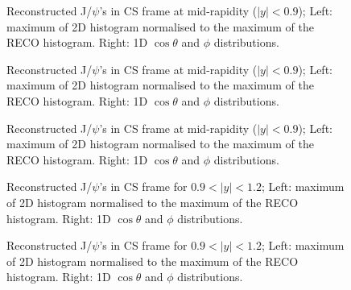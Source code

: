 \documentclass[12pt]{article}
\newcommand{\jpsi}{J/$\psi$}
\begin{document}
\begin{figure}[htbp]
\centering
{}
\caption{Reconstructed \jpsi's in CS frame at mid-rapidity ($|y| < 0.9$); Left: maximum of 2D histogram normalised to the maximum of the RECO histogram. Right: 1D $\cos\theta$ and $\phi$ distributions.}
\label{fig:trackerMuonsVsEta}
\end{figure} \clearpage 

\begin{figure}[htbp]
\centering
{}
\caption{Reconstructed \jpsi's in CS frame at mid-rapidity ($|y| < 0.9$); Left: maximum of 2D histogram normalised to the maximum of the RECO histogram. Right: 1D $\cos\theta$ and $\phi$ distributions.}
\label{fig:trackerMuonsVsEta}
\end{figure} \clearpage 

\begin{figure}[htbp]
\centering
{}
\caption{Reconstructed \jpsi's in CS frame at mid-rapidity ($|y| < 0.9$); Left: maximum of 2D histogram normalised to the maximum of the RECO histogram. Right: 1D $\cos\theta$ and $\phi$ distributions.}
\label{fig:trackerMuonsVsEta}
\end{figure} \clearpage 


\begin{figure}[htbp]
\centering
{}
\caption{Reconstructed \jpsi's in CS frame for $0.9 < |y| < 1.2$; Left: maximum of 2D histogram normalised to the maximum of the RECO histogram. Right: 1D $\cos\theta$ and $\phi$ distributions.}
\label{fig:trackerMuonsVsEta}
\end{figure} \clearpage 

\begin{figure}[htbp]
\centering
{}
\caption{Reconstructed \jpsi's in CS frame for $0.9 < |y| < 1.2$; Left: maximum of 2D histogram normalised to the maximum of the RECO histogram. Right: 1D $\cos\theta$ and $\phi$ distributions.}
\label{fig:trackerMuonsVsEta}
\end{figure} \clearpage 
\end{document}
